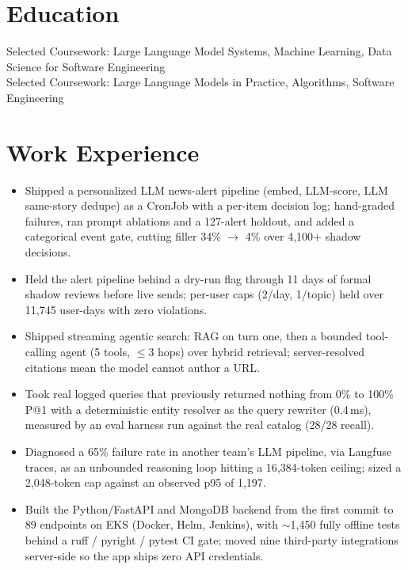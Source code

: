 \documentclass[11pt, letterpaper]{article}
\begin{document}

\section{Education}
Selected Coursework: Large Language Model Systems, Machine Learning, Data Science for Software Engineering\\[1pt]
Selected Coursework: Large Language Models in Practice, Algorithms, Software Engineering

\section{Work Experience}
\begin{itemize}
  \item Shipped a personalized LLM news-alert pipeline (embed, LLM-score, LLM same-story dedupe) as a CronJob with a per-item decision log; hand-graded failures, ran prompt ablations and a 127-alert holdout, and added a categorical event gate, cutting filler 34\% $\rightarrow$ 4\% over 4{,}100+ shadow decisions.
  \item Held the alert pipeline behind a dry-run flag through 11 days of formal shadow reviews before live sends; per-user caps (2/day, 1/topic) held over 11{,}745 user-days with zero violations.
  \item Shipped streaming agentic search: RAG on turn one, then a bounded tool-calling agent (5 tools, $\le$3 hops) over hybrid retrieval; server-resolved citations mean the model cannot author a URL.
  \item Took real logged queries that previously returned nothing from 0\% to 100\% P@1 with a deterministic entity resolver as the query rewriter (0.4\,ms), measured by an eval harness run against the real catalog (28/28 recall).
  \item Diagnosed a 65\% failure rate in another team's LLM pipeline, via Langfuse traces, as an unbounded reasoning loop hitting a 16{,}384-token ceiling; sized a 2{,}048-token cap against an observed p95 of 1{,}197.
  \item Built the Python/FastAPI and MongoDB backend from the first commit to 89 endpoints on EKS (Docker, Helm, Jenkins), with $\sim$1{,}450 fully offline tests behind a ruff / pyright / pytest CI gate; moved nine third-party integrations server-side so the app ships zero API credentials.
\end{itemize}
\end{document}
